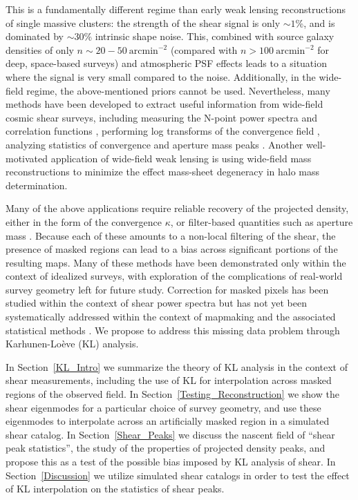 This is a fundamentally different regime 
than early weak lensing reconstructions
of single massive clusters: the strength of the shear signal is only
$\sim 1$\%, and is dominated by $\sim 30$\% intrinsic shape noise.  
This, combined with source galaxy densities of only 
$n \sim 20-50\ \mathrm{arcmin}^{-2}$
(compared with $n > 100\ \mathrm{arcmin}^{-2}$ for deep, space-based surveys)
and atmospheric PSF effects leads to a situation where the signal is 
very small compared to the noise.  
Additionally, in the wide-field regime,
the above-mentioned priors cannot be used.  
Nevertheless, many methods have been developed to extract useful
information from wide-field cosmic shear surveys, including
measuring the N-point power spectra and correlation functions 
\citep{Schneider02,Takada04,Hikage10}, 
performing log transforms of the convergence field 
\citep{Neyrinck09,Neyrinck10,Scherrer10,Seo11},
analyzing statistics of convergence and aperture mass peaks 
\citep{Marian10,Dietrich10,Schmidt10,Kratochvil10,Maturi11}.
Another well-motivated application of wide-field weak lensing 
is using wide-field mass reconstructions to minimize the effect
mass-sheet degeneracy in halo mass determination.

Many of the above applications require reliable recovery of 
the projected density, 
either in the form of the convergence $\kappa$, or filter-based quantities 
such as aperture mass \citep{Schneider98}.  
Because each of these amounts to a non-local filtering of the shear, 
the presence of masked regions can lead to a bias across significant
portions of the resulting maps.  Many of these methods have been demonstrated 
only within the context of idealized surveys, with exploration of the 
complications of real-world survey geometry left for future study.  
Correction for masked pixels has been studied within the context 
of shear power spectra \citep{Schneider10,Hikage10}
but has not yet been systematically addressed
within the context of mapmaking and the associated statistical methods
\citep[see, however,][for some possible approaches]{Padmanabhan03,Pires09}.
We propose to address this missing data problem through 
Karhunen-Lo\`{e}ve (KL) analysis.

In Section~\ref{KL_Intro} we summarize the theory of KL analysis in the
context of shear measurements, including the use of KL for interpolation
across masked regions of the observed field.
In Section~\ref{Testing_Reconstruction} we show the shear eigenmodes for
a particular choice of survey geometry, and use these eigenmodes to
interpolate across an artificially masked region in a simulated shear catalog.
In Section~\ref{Shear_Peaks} we discuss the nascent field of 
``shear peak statistics'',
the study of the properties of projected density peaks, and propose this
as a test of the possible bias imposed by KL analysis of shear.
In Section~\ref{Discussion} we utilize simulated shear catalogs 
in order to test the effect of KL interpolation on
the statistics of shear peaks.

